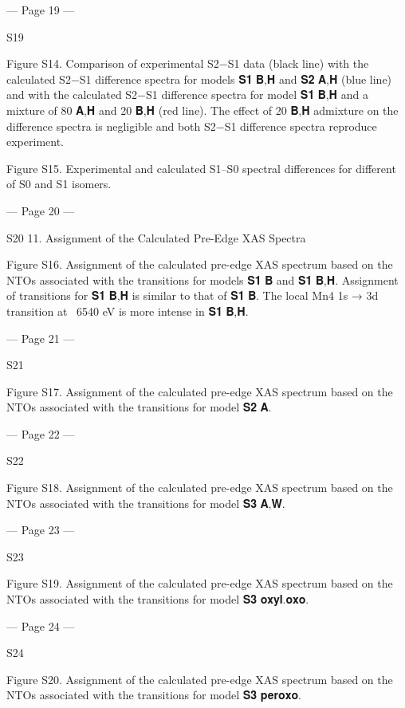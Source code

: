  


--- Page 19 ---
 
S19 
 
Figure S14. Comparison of experimental S2−S1 data (black line) with the calculated S2−S1 difference spectra 
for models 𝐒𝟏
 𝐁,𝐇 and 𝐒𝟐
 𝐀,𝐇 (blue line) and with the calculated S2−S1 difference spectra for model 𝐒𝟏
 𝐁,𝐇 and a 
mixture of 80%
 𝐀,𝐇 and 20%
 𝐁,𝐇 (red line). The effect of 20%
 𝐁,𝐇 admixture on the difference spectra is 
negligible and both S2−S1 difference spectra reproduce experiment.  
 
 
Figure S15. Experimental and calculated S1–S0 spectral differences for different of S0 and S1 isomers.  
 
 
 


--- Page 20 ---
 
S20 
11. Assignment of the Calculated Pre-Edge XAS Spectra 
 
 
Figure S16. Assignment of the calculated pre-edge XAS spectrum based on the NTOs associated with the 
transitions for models 𝐒𝟏
 𝐁 and 𝐒𝟏
 𝐁,𝐇. Assignment of transitions for 𝐒𝟏
 𝐁,𝐇 is similar to that of 𝐒𝟏
 𝐁. The local Mn4 
1s → 3d transition at ~6540 eV is more intense in 𝐒𝟏
 𝐁,𝐇. 
 


--- Page 21 ---
 
S21 
 
Figure S17. Assignment of the calculated pre-edge XAS spectrum based on the NTOs associated with the 
transitions for model 𝐒𝟐
 𝐀. 
 


--- Page 22 ---
 
S22 
 
Figure S18. Assignment of the calculated pre-edge XAS spectrum based on the NTOs associated with the 
transitions for model 𝐒𝟑
 𝐀,𝐖. 
 


--- Page 23 ---
 
S23 
 
Figure S19. Assignment of the calculated pre-edge XAS spectrum based on the NTOs associated with the 
transitions for model 𝐒𝟑
 𝐨𝐱𝐲𝐥.𝐨𝐱𝐨. 
 


--- Page 24 ---
 
S24 
 
Figure S20. Assignment of the calculated pre-edge XAS spectrum based on the NTOs associated with the 
transitions for model 𝐒𝟑
 𝐩𝐞𝐫𝐨𝐱𝐨. 
 


